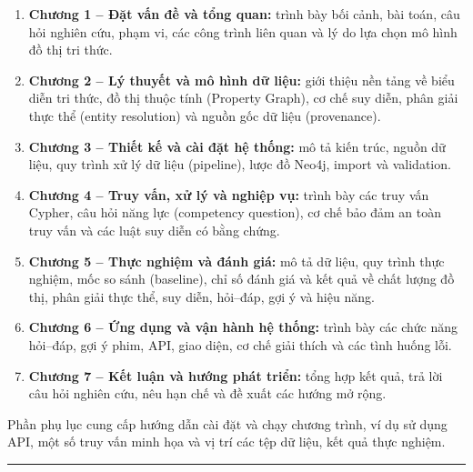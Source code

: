\begin{enumerate}
\item \textbf{Chương 1 – Đặt vấn đề và tổng quan:} trình bày bối cảnh, bài toán,
câu hỏi nghiên cứu, phạm vi, các công trình liên quan và lý do lựa chọn mô hình
đồ thị tri thức.
\item \textbf{Chương 2 – Lý thuyết và mô hình dữ liệu:} giới thiệu nền tảng về
biểu diễn tri thức, đồ thị thuộc tính (Property Graph), cơ chế suy
diễn, phân giải thực thể (entity resolution) và nguồn gốc dữ liệu (provenance).
\item \textbf{Chương 3 – Thiết kế và cài đặt hệ thống:} mô tả kiến trúc, nguồn
dữ liệu, quy trình xử lý dữ liệu (pipeline), lược đồ Neo4j, import và validation.
\item \textbf{Chương 4 – Truy vấn, xử lý và nghiệp vụ:} trình bày các truy vấn
Cypher, câu hỏi năng lực (competency question), cơ chế bảo đảm an toàn truy vấn và các luật
suy diễn có bằng chứng.
\item \textbf{Chương 5 – Thực nghiệm và đánh giá:} mô tả dữ liệu, quy trình thực
nghiệm, mốc so sánh (baseline), chỉ số đánh giá và kết quả về chất lượng đồ thị,
phân giải thực thể, suy diễn, hỏi–đáp, gợi ý và hiệu năng.
\item \textbf{Chương 6 – Ứng dụng và vận hành hệ thống:} trình bày các chức năng
hỏi–đáp, gợi ý phim, API, giao diện, cơ chế giải thích và các tình huống lỗi.
\item \textbf{Chương 7 – Kết luận và hướng phát triển:} tổng hợp kết quả, trả lời
câu hỏi nghiên cứu, nêu hạn chế và đề xuất các hướng mở rộng.
\end{enumerate}

Phần phụ lục cung cấp hướng dẫn cài đặt và chạy chương trình, ví dụ sử dụng API,
một số truy vấn minh họa và vị trí các tệp dữ liệu, kết quả thực nghiệm.

\bigskip\hrule\bigskip
